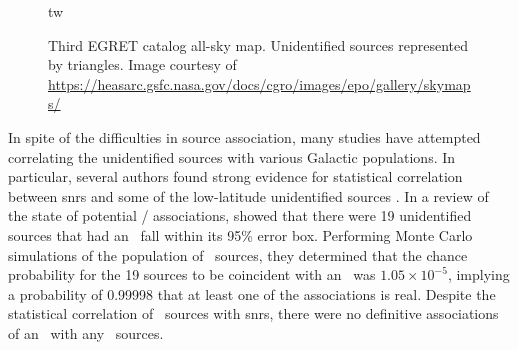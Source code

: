 \begin{figure}[h!]%
	\centering
	\caption{Third EGRET catalog all-sky map. Unidentified sources represented by triangles. Image courtesy of \url{https://heasarc.gsfc.nasa.gov/docs/cgro/images/epo/gallery/skymaps/}}tw
	\label{fig:3EGSky} 
\end{figure}

In spite of the difficulties in \egret{} source association, many studies have attempted correlating the unidentified \egret{} sources with various Galactic populations. In particular, several authors found strong evidence for statistical correlation between \glspl{snr} and some of the low-latitude unidentified sources \citep{Sturner95, Esposito96, Romero99}. In a review of the state of potential \snr{} /  \egret{} associations, \cite{Torres03} showed that there were 19 unidentified \egret{} sources that had an \snr~fall within its 95\% error box. Performing Monte Carlo simulations of the population of  \egret~sources, they determined that the chance probability for the 19 sources to be coincident with an \snr~was $1.05 \times 10^{-5}$, implying a probability of 0.99998 that at least one of the associations is real. Despite the statistical correlation of \egret~sources with \glspl{snr}, there were no definitive associations of an \snr~with any \egret~sources.

